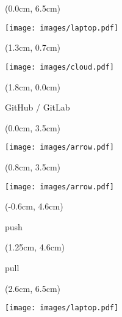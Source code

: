 \documentclass[aspectratio=169]{beamer}
\begin{document}
\begin{frame}{}

  \begin{textblock*}{5cm}(0.0cm, 6.5cm)
    \begin{center}
      \texttt{[image: images/laptop.pdf]}
    \end{center}
  \end{textblock*}

  \begin{textblock*}{5cm}(1.3cm, 0.7cm)
    \begin{center}
      \texttt{[image: images/cloud.pdf]}
    \end{center}
  \end{textblock*}
  
  \begin{textblock*}{5cm}(1.8cm, 0.0cm)
    \begin{center}
      {\small GitHub / GitLab}
    \end{center}
  \end{textblock*}  

  \begin{textblock*}{5cm}(0.0cm, 3.5cm)
    \begin{center}
      \texttt{[image: images/arrow.pdf]}
    \end{center}
  \end{textblock*}

  \begin{textblock*}{5cm}(0.8cm, 3.5cm)
    \begin{center}
      \texttt{[image: images/arrow.pdf]}
    \end{center}
  \end{textblock*}
  
  \begin{textblock*}{5cm}(-0.6cm, 4.6cm)
    \begin{center}
      {\small push}
    \end{center}
  \end{textblock*}

  \begin{textblock*}{5cm}(1.25cm, 4.6cm)
    \begin{center}
      {\small pull}
    \end{center}
  \end{textblock*}    
  
  \begin{textblock*}{5cm}(2.6cm, 6.5cm)
    \begin{center}
      \texttt{[image: images/laptop.pdf]}
    \end{center}
  \end{textblock*}  


\end{frame}
\end{document}
